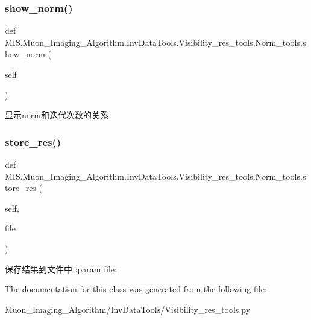 \subsubsection{\texorpdfstring{show\+\_\+norm()}{show\_norm()}}
{\footnotesize\ttfamily def M\+I\+S.\+Muon\+\_\+\+Imaging\+\_\+\+Algorithm.\+Inv\+Data\+Tools.\+Visibility\+\_\+res\+\_\+tools.\+Norm\+\_\+tools.\+show\+\_\+norm (\begin{DoxyParamCaption}\item[{}]{self }\end{DoxyParamCaption})}

\begin{DoxyVerb}显示norm和迭代次数的关系
\end{DoxyVerb}
 \mbox{\label{classMIS_1_1Muon__Imaging__Algorithm_1_1InvDataTools_1_1Visibility__res__tools_1_1Norm__tools_ad28891be9bc7fb1f9175bf16330edfaa}} 
\subsubsection{\texorpdfstring{store\+\_\+res()}{store\_res()}}
{\footnotesize\ttfamily def M\+I\+S.\+Muon\+\_\+\+Imaging\+\_\+\+Algorithm.\+Inv\+Data\+Tools.\+Visibility\+\_\+res\+\_\+tools.\+Norm\+\_\+tools.\+store\+\_\+res (\begin{DoxyParamCaption}\item[{}]{self,  }\item[{}]{file }\end{DoxyParamCaption})}

\begin{DoxyVerb}保存结果到文件中
:param file:
\end{DoxyVerb}
 

The documentation for this class was generated from the following file\+:\begin{DoxyCompactItemize}
\item 
Muon\+\_\+\+Imaging\+\_\+\+Algorithm/\+Inv\+Data\+Tools/Visibility\+\_\+res\+\_\+tools.\+py\end{DoxyCompactItemize}
